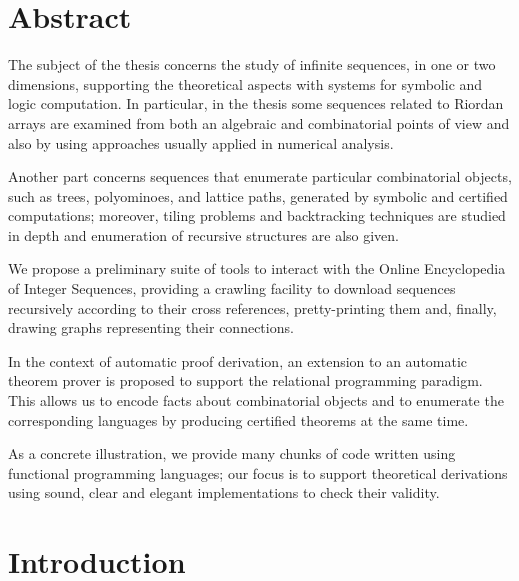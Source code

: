 \documentclass[a4paper,10pt]{tufte-book}
\begin{document}
\fontsize{12pt}{15pt}\selectfont




\blankpage



\cleardoublepage



\cleardoublepage

\chapter*{Abstract}

\indent The subject of the thesis concerns the study of infinite sequences, in
one or two dimensions, supporting the theoretical aspects with systems for
symbolic and logic computation. In particular, in the thesis some sequences
related to Riordan arrays are examined from both an algebraic and combinatorial
points of view and also by using approaches usually applied in numerical
analysis.

Another part concerns sequences that enumerate particular combinatorial
objects, such as trees, polyominoes, and lattice paths, generated by symbolic
and certified computations; moreover, tiling problems and backtracking
techniques are studied in depth and enumeration of recursive structures are
also given.

We propose a preliminary suite of tools to interact with the Online
Encyclopedia of Integer Sequences, providing a crawling facility to download
sequences recursively according to their cross references, pretty-printing them
and, finally, drawing graphs representing their connections.

In the context of automatic proof derivation, an extension to an automatic
theorem prover is proposed to support the relational programming paradigm.
This allows us to encode facts about combinatorial objects and to enumerate the
corresponding languages by producing certified theorems at the same time.

As a concrete illustration, we provide many chunks of code written using
functional programming languages; our focus is to support theoretical
derivations using sound, clear and elegant implementations to check their
validity.


\tableofcontents

\listoftables


\chapter*{Introduction}

\end{document}
